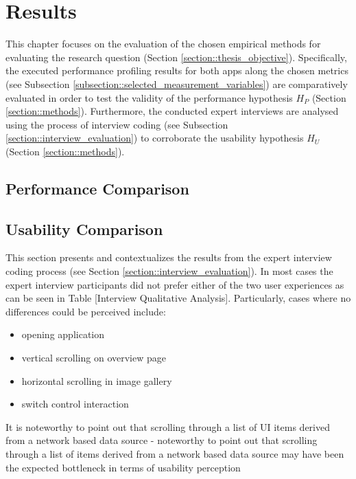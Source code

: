 
\chapter{Results} \label{chapter::results}
This chapter focuses on the evaluation of the chosen empirical methods for evaluating the research question (Section \ref{section::thesis_objective}).
Specifically, the executed performance profiling results for both apps
along the chosen metrics (see Subsection \ref{subsection::selected_measurement_variables}) are comparatively evaluated in order to test the validity of the performance hypothesis $H_P$ (Section \ref{section::methods}).
Furthermore, the conducted expert interviews are analysed using the process of interview coding (see Subsection \ref{section::interview_evaluation}) to corroborate the usability hypothesis $H_U$ (Section \ref{section::methods}).

\section{Performance Comparison} \label{section::performance_comparison}






\section{Usability Comparison} \label{section::usability_comparison}
This section presents and contextualizes the results from the expert interview coding process (see Section \ref{section::interview_evaluation}).
In most cases the expert interview participants did not prefer either of the two user experiences as can be seen in Table [Interview Qualitative Analysis].
Particularly, cases where no differences could be perceived include:
\begin{itemize}
    \item opening application
    \item vertical scrolling on overview page
    \item horizontal scrolling in image gallery
    \item switch control interaction
\end{itemize}
It is noteworthy to point out that scrolling through a list of UI items derived from a network based data source 
- noteworthy to point out that scrolling through a list of items derived from a network based data source may have been the expected bottleneck in terms of usability perception


